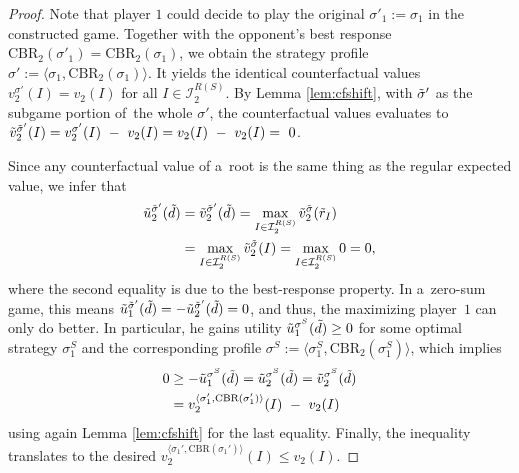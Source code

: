 \begin{proof}
  Note that player $1$ could decide to play the original $\sigma'_1 := \sigma_1$ in the constructed game.
  Together with the opponent's best response $\textrm{CBR}_2(\sigma'_1) = \textrm{CBR}_2(\sigma_1)$, we obtain the strategy profile 
  $\sigma' := \langle \sigma_1, \textrm{CBR}_2(\sigma_1) \rangle$.
  It yields the identical counterfactual values
  $v_2 ^{\sigma'} (I) = v_2(I)$ for all $I\in\mathcal{I}_2^{R(S)}$.
  By Lemma \ref{lem:cfshift}, with ${\tilde{\sigma}}'$ as the subgame portion of~the whole $\sigma'$, the counterfactual values evaluates to
  $\tilde{v}_2 ^{{\tilde{\sigma}}'}(I)
  = v_2 ^{\sigma'} (I)~-~v_2(I)
  = v_2(I)~-~v_2(I)
  =~0$.

  Since any counterfactual value of a~root is the same thing as the regular expected value, we infer that
  \begin{equation*}
    \begin{split}
      \tilde{u}_2 ^{{\tilde{\sigma}}'} (\tilde{d})
      &= \tilde{v}_2 ^{{\tilde{\sigma}}'} (\tilde{d})
      = \max _{I\in \mathcal{I}_2^{R(S)}} \tilde{v}_2 ^{\tilde{\sigma}} (\tilde{r}_I) \\
      &= \max _{I\in \mathcal{I}_2^{R(S)}} \tilde{v}_2 ^{\tilde{\sigma}} (I)
      = \max _{I\in \mathcal{I}_2^{R(S)}} 0 
      = 0,
    \end{split}
  \end{equation*}
  where the second equality is due to the best-response property.
  In a~zero-sum game, this means 
  $
  \tilde{u}_1 ^{{\tilde{\sigma}}'} (\tilde{d})
  = - \tilde{u}_2 ^{{\tilde{\sigma}}'} (\tilde{d})
  = 0
  $,
  and thus, the maximizing player~$1$ can only do better.
  In particular, he gains utility
  $
  \tilde{u}_1 ^{\sigma^S} (\tilde{d}) \ge 0
  $
  for some optimal strategy $\sigma_1^S$ and the corresponding profile
  $\sigma^S := \langle \sigma_1^S, \textrm{CBR}_2 (\sigma_1^S)\rangle$,
  which implies
  \begin{equation*}
    \begin{split}
      0
      &\ge - \tilde{u}_1 ^{\sigma^S} (\tilde{d})
      = \tilde{u}_2 ^{\sigma^S} (\tilde{d})
      = \tilde{v}_2 ^{\sigma^S} (\tilde{d}) \\
      &= v_2 ^{\langle\sigma_1', \textrm{CBR}(\sigma_1')\rangle} (I)~-~v_2(I)
    \end{split}
  \end{equation*}
  using again Lemma \ref{lem:cfshift} for the last equality.
  Finally, the inequality translates to the desired
  $
  v_2 ^{\langle\sigma_1', \textrm{CBR}(\sigma_1')\rangle} (I) \le v_2(I).
  $
\end{proof}

